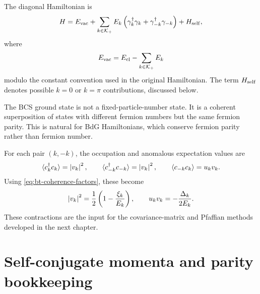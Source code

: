 The diagonal Hamiltonian is
\begin{equation}
\label{eq:bt-full-diagonal-hamiltonian}
    H
    =
    E_{\rm vac}
    +
    \sum_{k\in\mathcal{K}_+}E_k
    \left(
        \gamma_k^\dagger\gamma_k+
        \gamma_{-k}^\dagger\gamma_{-k}
    \right)
    +H_{\rm self},
\end{equation}
where
\begin{equation}
\label{eq:bt-paired-sector-vacuum-energy}
    E_{\rm vac}=E_{\rm cl}-\sum_{k\in\mathcal{K}_+}E_k
\end{equation}
modulo the constant convention used in the original Hamiltonian.  The term
$H_{\rm self}$ denotes possible $k=0$ or $k=\pi$ contributions, discussed below.

\begin{principle}
The BCS ground state is not a fixed-particle-number state.  It is a coherent
superposition of states with different fermion numbers but the same fermion
parity.  This is natural for BdG Hamiltonians, which conserve fermion parity
rather than fermion number.
\end{principle}

For each pair $(k,-k)$, the occupation and anomalous expectation values are
\begin{equation}
\label{eq:bt-bcs-basic-contractions}
    \langle c_k^\dagger c_k\rangle=\left|v_k\right|^2,
    \qquad
    \langle c_{-k}^\dagger c_{-k}\rangle=\left|v_k\right|^2,
    \qquad
    \langle c_{-k}c_k\rangle=u_kv_k.
\end{equation}
Using \cref{eq:bt-coherence-factors}, these become
\begin{equation}
\label{eq:bt-bcs-basic-contractions-explicit}
    \left|v_k\right|^2=\frac12\left(1-\frac{\xi_k}{E_k}\right),
    \qquad
    u_kv_k=-\frac{\Delta_k}{2E_k}.
\end{equation}
These contractions are the input for the covariance-matrix and Pfaffian methods
developed in the next chapter.

\section{Self-conjugate momenta and parity bookkeeping}
\label{sec:bt-self-conjugate-momenta}

